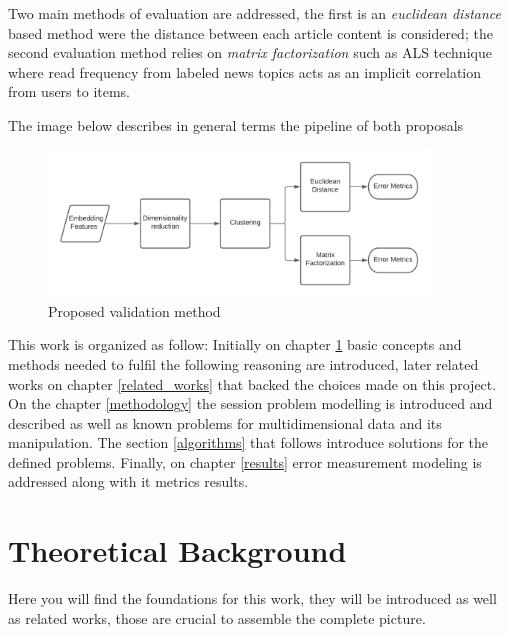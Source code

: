 \documentclass[ecp,tc,english]{iiufrgs}
\begin{document}
Two main methods of evaluation are addressed, the first is an \textit{euclidean distance} based method were the distance between each article content is considered; the second evaluation method relies on \textit{matrix factorization} such as ALS technique \cite{takane1977} where read frequency from labeled news topics acts as an implicit correlation from users to items.

The image below describes in general terms the pipeline of both proposals

\begin{figure}[H]
    \centering
    \includegraphics[width=0.9\textwidth]{images/experiment.png}
    \caption{Proposed validation method}
    \label{fig:method_architecture}
\end{figure}

This work is organized as follow: Initially on chapter \ref{theoretical_background_and_related_work} basic concepts and methods needed to fulfil the following reasoning are introduced, later related works on chapter \ref{related_works} that backed the choices made on this project. On the chapter \ref{methodology} the session problem modelling is introduced and described as well as known problems for multidimensional data and its manipulation. The section \ref{algorithms} that follows introduce solutions for the defined problems.
Finally, on chapter \ref{results} error measurement modeling is addressed along with it metrics results.


\chapter{Theoretical Background} \label{theoretical_background_and_related_work}
Here you will find the foundations for this work, they will be introduced as well as related works, those are crucial to assemble the complete picture.
\end{document}
